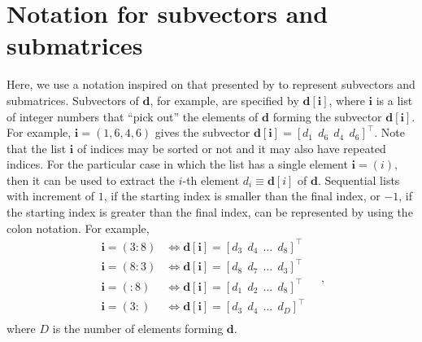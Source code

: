 \section{Notation for subvectors and submatrices}

Here, we use a notation inspired on that presented by \cite[][p. 4]{vanloan1992} to represent subvectors and submatrices.
Subvectors of $\mathbf{d}$, for example, are specified by $\mathbf{d}[\mathbf{i}]$, where $\mathbf{i}$ is a
list of integer numbers that ``pick out'' the elements of $\mathbf{d}$ forming the subvector $\mathbf{d}[\mathbf{i}]$.
For example, $\mathbf{i} = (1, 6, 4, 6)$ gives the subvector $\mathbf{d}[\mathbf{i}] = [ d_{1} \:\: d_{6} \:\: d_{4} \:\: d_{6} ]^{\top} $.
Note that the list $\mathbf{i}$ of indices may be sorted or not and it may also have repeated indices.
For the particular case in which the list has a single element $\mathbf{i} = (i)$, then it can be used to extract the $i$-th element 
$d_{i} \equiv \mathbf{d}[i]$ of $\mathbf{d}$.
Sequential lists with increment of $1$, if the starting index is smaller than the final index, or $-1$,
if the starting index is greater than the final index, can be represented by using the colon notation. For example, 
\begin{equation*}
	\begin{split}
		\mathbf{i} = (3:8) &\Leftrightarrow \mathbf{d}[\mathbf{i}] = [ d_{3} \:\: d_{4} \:\: \dots \:\: d_{8} ]^{\top} \\
		\mathbf{i} = (8:3) &\Leftrightarrow \mathbf{d}[\mathbf{i}] = [ d_{8} \:\: d_{7} \:\: \dots \:\: d_{3} ]^{\top} \\
		\mathbf{i} = (:8) &\Leftrightarrow \mathbf{d}[\mathbf{i}] = [ d_{1} \:\: d_{2} \:\: \dots \:\: d_{8} ]^{\top} \\
		\mathbf{i} = (3:) &\Leftrightarrow \mathbf{d}[\mathbf{i}] = [ d_{3} \:\: d_{4} \:\: \dots \:\: d_{D} ]^{\top} \\
	\end{split} \quad ,
\end{equation*}
where $D$ is the number of elements forming $\mathbf{d}$.

